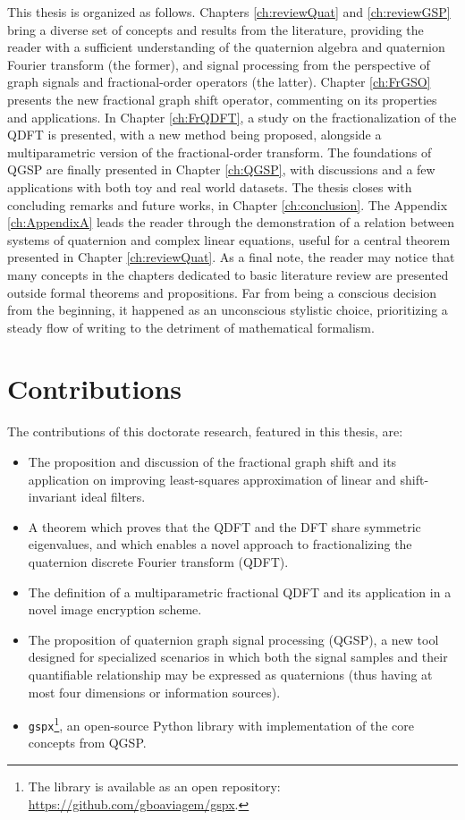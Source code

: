 This thesis is organized as follows. Chapters \ref{ch:reviewQuat} and \ref{ch:reviewGSP} bring a diverse set of concepts and results from the literature, providing the reader with a sufficient understanding of the quaternion algebra and quaternion Fourier transform (the former), and signal processing from the perspective of graph signals and fractional-order operators (the latter).
Chapter \ref{ch:FrGSO} presents the new fractional graph shift operator, commenting on its properties and applications.
In Chapter \ref{ch:FrQDFT}, a study on the fractionalization of the QDFT is presented, with a new method being proposed, alongside a multiparametric version of the fractional-order transform.
The foundations of QGSP are finally presented in Chapter \ref{ch:QGSP}, with discussions and a few applications with both toy and real world datasets.
The thesis closes with concluding remarks and future works, in Chapter \ref{ch:conclusion}. The Appendix \ref{ch:AppendixA} leads the reader through the demonstration of a relation between systems of quaternion and complex linear equations, useful for a central theorem presented in Chapter \ref{ch:reviewQuat}. As a final note, the reader may notice that many concepts in the chapters dedicated to basic literature review are presented outside formal theorems and propositions. Far from being a conscious decision from the beginning, it happened as an unconscious stylistic choice, prioritizing a steady flow of writing to the detriment of mathematical formalism.

\section{Contributions}
The contributions of this doctorate research, featured in this thesis, are:

\vspace{-1em}
\begin{itemize}[noitemsep]
    \item The proposition and discussion of the fractional graph shift and its application on improving least-squares approximation of linear and shift-invariant ideal filters.
    \item A theorem which proves that the QDFT and the DFT share symmetric eigenvalues, and which enables a novel approach to fractionalizing the quaternion discrete Fourier transform (QDFT).
    \item The definition of a multiparametric fractional QDFT and its application in a novel image encryption scheme.
    \item The proposition of quaternion graph signal processing (QGSP), a new tool designed for specialized scenarios in which both the signal samples and their quantifiable relationship may be expressed as quaternions (thus having at most four dimensions or information sources).
    \item \texttt{gspx}\footnote{The library is available as an open repository: \url{https://github.com/gboaviagem/gspx}.}, an open-source Python library with implementation of the core concepts from QGSP.
\end{itemize}

